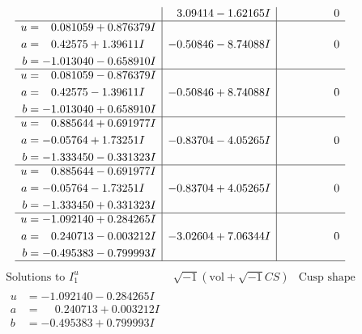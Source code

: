 \documentclass[1p]{elsarticle_modified}
\theoremstyle{definition}
\newcommand{\I}{\sqrt{-1}}
\begin{document}
$$\begin{array}{c|c|c}
 & \phantom{-}3.09414 - 1.62165 I & \phantom{-0.000000 } 0 \\ \hline\begin{aligned}
u &= \phantom{-}0.081059 + 0.876379 I \\
a &= \phantom{-}0.42575 + 1.39611 I \\
b &= -1.013040 - 0.658910 I\end{aligned}
 & -0.50846 - 8.74088 I & \phantom{-0.000000 } 0 \\ \hline\begin{aligned}
u &= \phantom{-}0.081059 - 0.876379 I \\
a &= \phantom{-}0.42575 - 1.39611 I \\
b &= -1.013040 + 0.658910 I\end{aligned}
 & -0.50846 + 8.74088 I & \phantom{-0.000000 } 0 \\ \hline\begin{aligned}
u &= \phantom{-}0.885644 + 0.691977 I \\
a &= -0.05764 + 1.73251 I \\
b &= -1.333450 - 0.331323 I\end{aligned}
 & -0.83704 - 4.05265 I & \phantom{-0.000000 } 0 \\ \hline\begin{aligned}
u &= \phantom{-}0.885644 - 0.691977 I \\
a &= -0.05764 - 1.73251 I \\
b &= -1.333450 + 0.331323 I\end{aligned}
 & -0.83704 + 4.05265 I & \phantom{-0.000000 } 0 \\ \hline\begin{aligned}
u &= -1.092140 + 0.284265 I \\
a &= \phantom{-}0.240713 - 0.003212 I \\
b &= -0.495383 - 0.799993 I\end{aligned}
 & -3.02604 + 7.06344 I & \phantom{-0.000000 } 0\\
 \hline 
 \end{array}$$\newpage$$\begin{array}{c|c|c}  
\text{Solutions to }I^u_{1}& \I (\text{vol} + \sqrt{-1}CS) & \text{Cusp shape}\\
 \hline 
\begin{aligned}
u &= -1.092140 - 0.284265 I \\
a &= \phantom{-}0.240713 + 0.003212 I \\
b &= -0.495383 + 0.799993 I\end{aligned}

\end{array}$$
\end{document}
